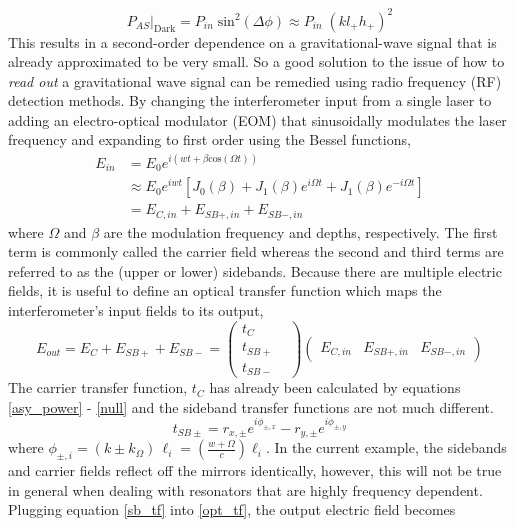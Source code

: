 			\begin{equation}\label{null}
			P_{AS} \vert_{\text{Dark}} = P_{in} \; \text{sin}^2 (\Delta \phi) \approx P_{in} \; (k l_{+} h_{+})^2 
			\end{equation}
		This results in a second-order dependence on a gravitational-wave signal that is already approximated to be very small.  So a good solution to the issue of how to \textit{read out} a gravitational wave signal can be remedied using radio frequency (RF) detection methods. By changing the interferometer input from a single laser to adding an electro-optical modulator (EOM) that sinusoidally modulates the laser frequency and expanding to first order using the Bessel functions,
			\begin{equation}\label{modE}
			\begin{aligned}
			E_{in} 	&= E_{0} e^{i(wt + \beta \text{cos} (\Omega t))} \\
					&\approx E_0 e^{iwt} [J_0(\beta) + J_1(\beta) e^{i \Omega t} + J_1(\beta) e^{-i \Omega t}] \\
					&= E_{C,in} + E_{SB+,in} + E_{SB-,in}
			\end{aligned}
			\end{equation}
		where $\Omega$ and $\beta$ are the modulation frequency and depths, respectively. The first term is commonly called the carrier field whereas the second and third terms are referred to as the (upper or lower) sidebands.  Because there are multiple electric fields, it is useful to define an optical transfer function which maps the interferometer's input fields to its output,
		\begin{equation}\label{opt_tf}
		E_{out} = E_{C} + E_{SB+} + E_{SB-} = 
		\begin{pmatrix}
			t_{C} 	&   
		\\ 	t_{SB+} &
		\\ 	t_{SB-} &
		\end{pmatrix}
		\begin{pmatrix}
		E_{C,in} &    E_{SB+,in}    &  E_{SB-,in}     
		\end{pmatrix}
		\end{equation}
		The carrier transfer function, $t_{C}$ has already been calculated by equations \ref{asy_power} - \ref{null} and the sideband transfer functions are not much different.
		\begin{equation}\label{sb_tf}
		t_{SB\pm} = r_{x,\pm}  e^{i\phi_{\pm,x}} - r_{y,\pm}  e^{i\phi_{\pm,y}}
		\end{equation}
		where $\phi_{\pm,i} = (k \pm k_{\Omega}) \, \ell_{i} = (\frac{w+\Omega}{c} ) \ell_{i}$. In the current example, the sidebands and carrier fields reflect off the mirrors identically, however, this will not be true in general when dealing with resonators that are highly frequency dependent.  Plugging equation \ref{sb_tf} into \ref{opt_tf}, the output electric field becomes 
